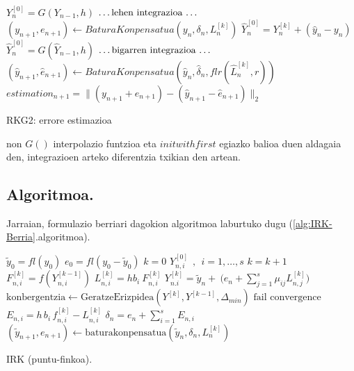 \begin{algorithm}[H]
  \BlankLine
  {
    \BlankLine
    $Y_n^{[0]}=G(Y_{n-1},h)$\;
    \BlankLine
    $\text{\dots lehen integrazioa \dots}$\;
	\BlankLine
    $(y_{n+1},e_{n+1})\leftarrow BaturaKonpensatua(y_n,\delta_n,L_n^{[k]})$\;      
    \BlankLine
    \BlankLine
    {$\hat{Y}_{n}^{[0]}=Y_{n}^{[k]}+(\hat{y}_n-y_n)$\;}
    {$\hat{Y}_{n}^{[0]}=G(\hat{Y}_{n-1},h)$\;}
    \BlankLine
    $\text{\dots bigarren integrazioa \dots}$\;
	\BlankLine
    $(\hat{y}_{n+1},\hat{e}_{n+1})\leftarrow BaturaKonpensatua(\hat{y}_n,\hat{\delta}_n,flr(\hat{L}_n^{[k]},r))$\;  
    \BlankLine
    \BlankLine
    $estimation_{n+1}=\|(y_{n+1}+e_{n+1})-(\hat{y}_{n+1}-\hat{e}_{n+1})\|_2$\;
    \BlankLine
   }
 \caption{RKG2: errore estimazioa}
 \label{alg:errore-estimazioa}
\end{algorithm}
non $G()$ interpolazio funtzioa eta $initwithfirst$ egiazko balioa duen aldagaia den, integrazioen arteko diferentzia txikian den artean.

\subsection{Algoritmoa.}

Jarraian, formulazio berriari dagokion algoritmoa laburtuko dugu (\ref{alg:IRK-Berria}.algoritmoa).

\begin{algorithm}[H]
 \BlankLine
  $\tilde{y}_0=fl(y_0)$\;
  $e_0=fl(y_0-\tilde{y}_0)$\;
  {
   \BlankLine
   $k=0$\;
     $Y_{n,i}^{[0]} \ \ , \ \ i=1,\dots,s $\;
   \BlankLine
   {
    \BlankLine 
    $k=k+1$\;
    $F_{n,i}^{[k]}=f(Y_{n,i}^{[k-1]}) $\;
    $L_{n,i}^{[k]}=hb_i \ F_{n,i}^{[k]} $\;
    $Y_{n.i}^{[k]}=\tilde{y}_{n} + \ \big(e_n+\sum\limits_{j=1}^{s} \mu_{ij} L_{n,j}^{[k]}\big)  $\;  
    $\text{konbergentzia} \leftarrow \text{GeratzeErizpidea}(Y^{[k]},Y^{[k-1]},\Delta_{min}) $\;
   }
   \BlankLine
   {
   {$\text{fail convergence}$\;}
   }
   $E_{n,i} = h\,   b_i\,f_{n,i}^{[k]}-L_{n,i}^{[k]}$\;
   $\delta_{n}=e_{n}+\sum_{i=1}^{s} E_{n,i}$\;
   $(\tilde y_{n+1}, e_{n+1})\leftarrow \text{baturakonpensatua}(\tilde y_{n},\delta_{n},L_{n}^{[k]})$\;
   \BlankLine
 }
 \caption{IRK (puntu-finkoa).}
 \label{alg:IRK-Berria}
\end{algorithm}

